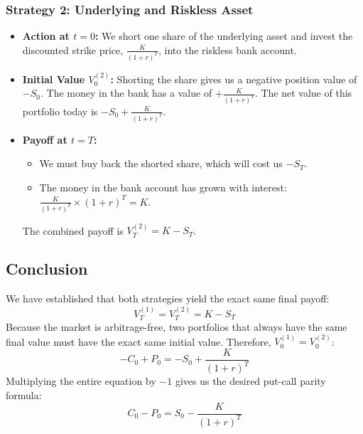 \subsubsection*{Strategy 2: Underlying and Riskless Asset}
\begin{itemize}
    \item \textbf{Action at $t=0$:} We short one share of the underlying asset and invest the discounted strike price, $\frac{K}{(1+r)^T}$, into the riskless bank account.
    \item \textbf{Initial Value $V_0^{(2)}$:} Shorting the share gives us a negative position value of $-S_0$. The money in the bank has a value of $+\frac{K}{(1+r)^T}$. The net value of this portfolio today is $-S_0 + \frac{K}{(1+r)^T}$.
    \item \textbf{Payoff at $t=T$:}
    \begin{itemize}
        \item We must buy back the shorted share, which will cost us $-S_T$.
        \item The money in the bank account has grown with interest: $\frac{K}{(1+r)^T} \times (1+r)^T = K$.
    \end{itemize}
    The combined payoff is $V_T^{(2)} = K - S_T$.
\end{itemize}

\subsection{Conclusion}
We have established that both strategies yield the exact same final payoff:
\begin{equation}
    V_T^{(1)} = V_T^{(2)} = K - S_T
\end{equation}
Because the market is arbitrage-free, two portfolios that always have the same final value must have the exact same initial value. Therefore, $V_0^{(1)} = V_0^{(2)}$:
\begin{equation}
    -C_0 + P_0 = -S_0 + \frac{K}{(1+r)^T}
\end{equation}
Multiplying the entire equation by $-1$ gives us the desired put-call parity formula:
\begin{equation}
    C_0 - P_0 = S_0 - \frac{K}{(1+r)^T}
\end{equation}